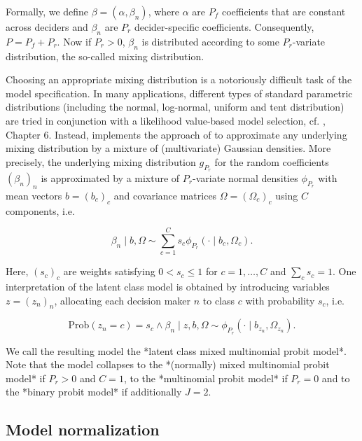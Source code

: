 \documentclass[article]{jss}
\begin{document}
Formally, we define $\beta = (\alpha, \beta_n)$, where $\alpha$ are $P_f$ coefficients that are constant across deciders and $\beta_n$ are $P_r$ decider-specific coefficients. Consequently, $P = P_f + P_r$. Now if $P_r>0$, $\beta_n$ is distributed according to some $P_r$-variate distribution, the so-called mixing distribution.

Choosing an appropriate mixing distribution is a notoriously difficult task of the model specification. In many applications, different types of standard parametric distributions (including the normal, log-normal, uniform and tent distribution) are tried in conjunction with a likelihood value-based model selection, cf. \cite{Train:2009}, Chapter 6. Instead,  implements the approach of \cite{Oelschlaeger:2020} to approximate any underlying mixing distribution by a mixture of (multivariate) Gaussian densities. More precisely, the underlying mixing distribution $g_{P_r}$ for the random coefficients $(\beta_n)_{n}$ is approximated by a mixture of $P_r$-variate normal densities $\phi_{P_r}$ with mean vectors $b=(b_c)_{c}$ and covariance matrices $\Omega=(\Omega_c)_{c}$ using $C$ components, i.e.

\begin{equation}
\beta_n\mid b,\Omega \sim \sum_{c=1}^{C} s_c \phi_{P_r} (\cdot \mid b_c,\Omega_c).
\end{equation}

Here, $(s_c)_{c}$ are weights satisfying $0 < s_c\leq 1$ for $c=1,\dots,C$ and $\sum_c s_c=1$. One interpretation of the latent class model is obtained by introducing variables $z=(z_n)_n$, allocating each decision maker $n$ to class $c$ with probability $s_c$, i.e.

\begin{equation}
\text{Prob}(z_n=c)=s_c \land \beta_n \mid z,b,\Omega \sim \phi_{P_r}(\cdot \mid b_{z_n},\Omega_{z_n}).
\end{equation}

We call the resulting model the *latent class mixed multinomial probit model*. Note that the model collapses to the *(normally) mixed multinomial probit model* if $P_r>0$ and $C=1$, to the *multinomial probit model* if $P_r=0$ and to the *binary probit model* if additionally $J=2$.

\subsection{Model normalization} \label{subsec:normalization}
\end{document}
